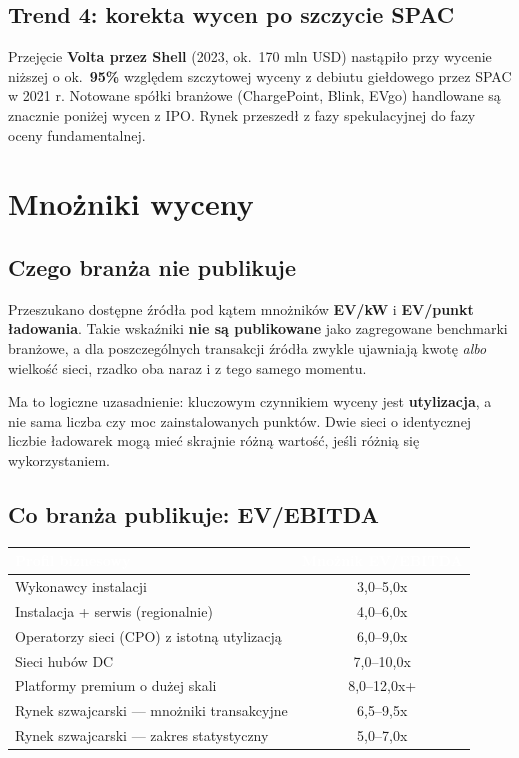 \documentclass[11pt,a4paper]{article}
\begin{document}
	\subsection{Trend 4: korekta wycen po szczycie SPAC}
	
	Przejęcie \textbf{Volta przez Shell} (2023, ok.\ 170 mln USD) nastąpiło przy
	wycenie niższej o ok.\ \textbf{95\%} względem szczytowej wyceny z debiutu
	giełdowego przez SPAC w 2021 r. Notowane spółki branżowe (ChargePoint,
	Blink, EVgo) handlowane są znacznie poniżej wycen z IPO. Rynek przeszedł
	z fazy spekulacyjnej do fazy oceny fundamentalnej.
	
	\section{Mnożniki wyceny}
	
	\subsection{Czego branża nie publikuje}
	
	Przeszukano dostępne źródła pod kątem mnożników \textbf{EV/kW}
	i \textbf{EV/punkt ładowania}. Takie wskaźniki \textbf{nie są publikowane}
	jako zagregowane benchmarki branżowe, a dla poszczególnych transakcji
	źródła zwykle ujawniają kwotę \emph{albo} wielkość sieci, rzadko oba
	naraz i z tego samego momentu.
	
	Ma to logiczne uzasadnienie: kluczowym czynnikiem wyceny jest
	\textbf{utylizacja}, a nie sama liczba czy moc zainstalowanych punktów.
	Dwie sieci o identycznej liczbie ładowarek mogą mieć skrajnie różną
	wartość, jeśli różnią się wykorzystaniem.
	
	\subsection{Co branża publikuje: EV/EBITDA}
	
	\begin{center}
		\begin{tabular}{lc}
			\toprule
			\rowcolor{granatowy}
			\textcolor{white}{\textbf{Profil biznesowy}} & \textcolor{white}{\textbf{Mnożnik EV/EBITDA}} \\
			\midrule
			Wykonawcy instalacji & 3,0--5,0x \\
			Instalacja + serwis (regionalnie) & 4,0--6,0x \\
			Operatorzy sieci (CPO) z istotną utylizacją & 6,0--9,0x \\
			Sieci hubów DC & 7,0--10,0x \\
			Platformy premium o dużej skali & 8,0--12,0x+ \\
			\midrule
			Rynek szwajcarski --- mnożniki transakcyjne & 6,5--9,5x \\
			Rynek szwajcarski --- zakres statystyczny & 5,0--7,0x \\
			\bottomrule
		\end{tabular}
	\end{center}
	
\end{document}
